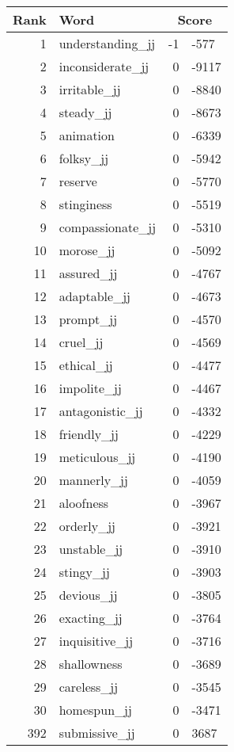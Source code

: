 \begin{longtable}[!htbp]{| rlr@{.}l |}
    \hline
    \textbf{Rank} & \textbf{Word} & \multicolumn{2}{c|}{\textbf{Score}} \\
    \hline
    \endhead
    1 & understanding\_jj & -1 & -577 \\
    2 & inconsiderate\_jj & 0 & -9117 \\
    3 & irritable\_jj & 0 & -8840 \\
    4 & steady\_jj & 0 & -8673 \\
    5 & animation & 0 & -6339 \\
    6 & folksy\_jj & 0 & -5942 \\
    7 & reserve & 0 & -5770 \\
    8 & stinginess & 0 & -5519 \\
    9 & compassionate\_jj & 0 & -5310 \\
    10 & morose\_jj & 0 & -5092 \\
    11 & assured\_jj & 0 & -4767 \\
    12 & adaptable\_jj & 0 & -4673 \\
    13 & prompt\_jj & 0 & -4570 \\
    14 & cruel\_jj & 0 & -4569 \\
    15 & ethical\_jj & 0 & -4477 \\
    16 & impolite\_jj & 0 & -4467 \\
    17 & antagonistic\_jj & 0 & -4332 \\
    18 & friendly\_jj & 0 & -4229 \\
    19 & meticulous\_jj & 0 & -4190 \\
    20 & mannerly\_jj & 0 & -4059 \\
    21 & aloofness & 0 & -3967 \\
    22 & orderly\_jj & 0 & -3921 \\
    23 & unstable\_jj & 0 & -3910 \\
    24 & stingy\_jj & 0 & -3903 \\
    25 & devious\_jj & 0 & -3805 \\
    26 & exacting\_jj & 0 & -3764 \\
    27 & inquisitive\_jj & 0 & -3716 \\
    28 & shallowness & 0 & -3689 \\
    29 & careless\_jj & 0 & -3545 \\
    30 & homespun\_jj & 0 & -3471 \\
    392 & submissive\_jj & 0 & 3687 \\

\end{longtable}
